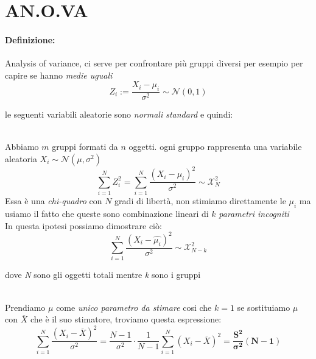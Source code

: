 \documentclass[]{article}
\newcommand{\definizione}{\paragraph{Definizione:}}
\begin{document}
    \section{AN.O.VA} 
    \definizione Analysis of variance, ci serve per confrontare più gruppi diversi per esempio per capire se hanno \textit{medie uguali}
    \[ Z_i := \frac{X_i - \mu_i}{\sigma^2} \sim \mathcal{N}(0,1) \]
    \centerline{le seguenti variabili aleatorie sono \textit{normali standard} e quindi:} \\[2ex]
    Abbiamo $m$ gruppi formati da $n$ oggetti. ogni gruppo rappresenta una variabile aleatoria $X_i \sim \mathcal{N}(\mu, \sigma^2)$
    \[ \sum_{i=1}^{N} Z^2_i = \sum_{i=1}^{N} \frac{(X_i - \mu_i)^2}{\sigma^2} \sim \mathcal{X}^2_N \]
    Essa è una \textit{chi-quadro} con $N$ gradi di libertà, non stimiamo direttamente le $\mu_i$ ma usiamo il fatto che queste sono combinazione lineari di $k$ \textit{parametri incogniti} \\
    In questa ipotesi possiamo dimostrare ciò:
    \[ \sum_{i=1}^{N} \frac{(X_i - \hat{\mu_i})^2}{\sigma^2} \sim \mathcal{X}^2_{N-k} \]
    \centerline{dove \textit{N} sono gli oggetti totali mentre \textit{k} sono i gruppi} \\[2ex]
    Prendiamo $\mu$ come \textit{unico parametro da stimare} cosi che $k=1$ se sostituiamo $\mu$ con $\overline{X}$ che è il suo stimatore, troviamo questa espressione:
    \[ \sum_{i=1}^{N} \frac{(X_i - \overline{X})^2}{\sigma^2} = \frac{N-1}{\sigma^2} \cdot \frac{1}{N-1} \sum_{i=1}^{N}(X_i - \overline{X})^2 = \boldsymbol{\frac{S^2}{\sigma^2}(N-1)} \]
\end{document}
